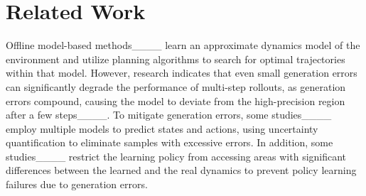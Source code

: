 \section{Related Work}
\noindent
Offline model-based methods____ learn an approximate dynamics model of the environment and utilize planning algorithms to search for optimal trajectories within that model.
However, research indicates that even small generation errors can significantly degrade the performance of multi-step rollouts, as generation errors compound, causing the model to deviate from the high-precision region after a few steps____.
To mitigate generation errors, some studies____ employ multiple models to predict states and actions, using uncertainty quantification to eliminate samples with excessive errors.
In addition, some studies____ restrict the learning policy from accessing areas with significant differences between the learned and the real dynamics to prevent policy learning failures due to generation errors.

